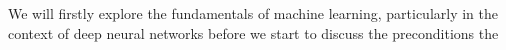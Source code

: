 We will firstly explore the fundamentals of machine learning, particularly in the context of deep neural networks before we start to discuss the preconditions the 